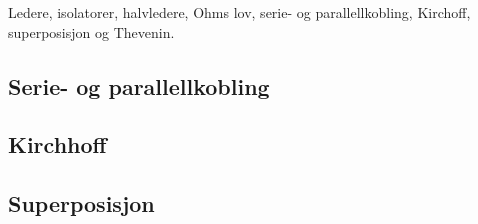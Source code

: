 Ledere, isolatorer, halvledere, Ohms lov, serie- og parallellkobling, Kirchoff, superposisjon og Thevenin.

\subsection{Serie- og parallellkobling}


\subsection{Kirchhoff}


\subsection{Superposisjon}

